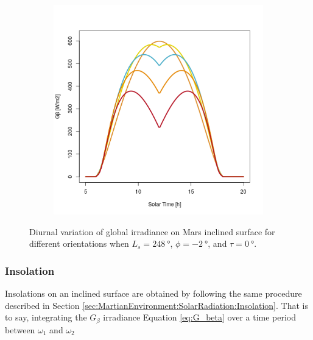\begin{figure}[H]
\begin{subfigure}[t]{\subfigureWidth}
  		\label{fig:sub:irradiance-inclined-gamma-c-m180}
  	\end{subfigure}\hfill
	   \begin{subfigure}[t]{\subfigureWidth}
      \centering
  		\includegraphics[height=\graphicsHeight]{sections/martian-environment/plots/diurnal-irradiance-slope-angle-variation-4-for-ls-248-phi-2-tau-05-and-gammac-270.png}
  		\label{fig:sub:irradiance-inclined-gamma-c-m270}
	   \end{subfigure}\hfill
	\caption{Diurnal variation of global irradiance on Mars inclined surface for different orientations when $L_{s} = \SI{248}{\degree}$, $\phi = \SI{-2}{\degree}$, and $\tau = \SI{0}{\degree}$.}
	\label{fig:plot:irradiance-inclined-gamma-c}
\vspace{-2ex}
\end{figure}

\subsubsection{Insolation}
\label{sec:MartianEnvironment:SolarRadiation:InclinedSurface:Insolation}

Insolations on an inclined surface are obtained by following the same procedure described in Section \ref{sec:MartianEnvironment:SolarRadiation:Insolation}. That is to say, integrating the $G_{\beta}$ irradiance Equation \ref{eq:G_beta} over a time period between $\omega_1$ and $\omega_2$

